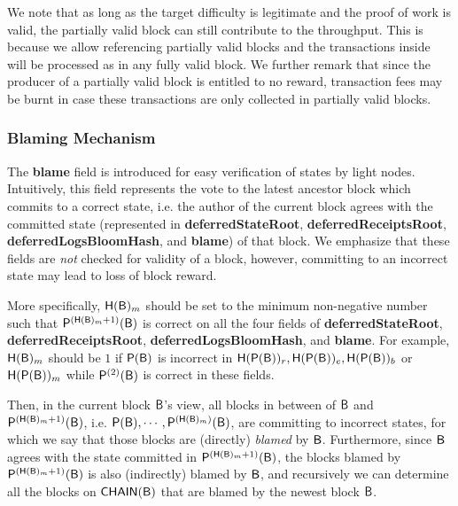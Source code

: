 We note that as long as the target difficulty is legitimate and the proof of work is valid,
the partially valid block can still contribute to the throughput.
This is because we allow referencing partially valid blocks and the transactions inside will be processed as in any fully valid block.
% 
We further remark that since the producer of a partially valid block is entitled to no reward, transaction fees may be burnt in case these transactions are only collected in partially valid blocks.







\subsubsection{Blaming Mechanism}
\label{sec:blaming}
	
	The {\bf blame} field is introduced for easy verification of states by light nodes.
	Intuitively, this field represents the vote to the latest ancestor block which commits to a correct state, 
	i.e. the author of the current block agrees with the committed state (represented in {\bf deferredStateRoot}, {\bf deferredReceiptsRoot}, {\bf deferredLogsBloomHash}, and {\bf blame}) of that block.
	We emphasize that these fields are \emph{not} checked for validity of a block, however, committing to an incorrect state may lead to loss of block reward.



	More specifically, $\textsf{H}(\textsf{B})_{m}$ should be set to the minimum non-negative number such that $\mathsf{P}^{\left(\textsf{H}(\textsf{B})_{m}+1\right)}(\textsf{B})$ is correct on all the four fields of {\bf deferredStateRoot}, {\bf deferredReceiptsRoot}, {\bf deferredLogsBloomHash}, and {\bf blame}.
	For example, $\textsf{H}(\textsf{B})_{m}$ should be $1$ if $\mathsf{P}{\left({\textsf{B}} \right)}$ is incorrect in $\textsf{H}(\mathsf{P}{\left({\textsf{B}} \right)})_{r}, \textsf{H}(\mathsf{P}{\left({\textsf{B}} \right)})_{e}, \textsf{H}(\mathsf{P}{\left({\textsf{B}} \right)})_{b}$ or $\textsf{H}(\mathsf{P}{\left({\textsf{B}} \right)})_{m}$ while $\mathsf{P}^{(2)}(\textsf{B})$ is correct in these fields.

	Then, in the current block $\textsf{B}$'s view, all blocks in between of $\textsf{B}$ and $\mathsf{P}^{\left(\textsf{H}(\textsf{B})_{m}+1\right)}(\textsf{B})$, i.e. $\mathsf{P}(\textsf{B}), \cdots, \mathsf{P}^{\left(\textsf{H}(\textsf{B})_{m}\right)}(\textsf{B})$, are committing to incorrect states, for which we say that those blocks are (directly) \emph{blamed} by $\textsf{B}$.
	Furthermore, since $\textsf{B}$ agrees with the state committed in $\mathsf{P}^{\left(\textsf{H}(\textsf{B})_{m}+1\right)}(\textsf{B})$,
	the blocks blamed by $\mathsf{P}^{\left(\textsf{H}(\textsf{B})_{m}+1\right)}(\textsf{B})$ is also (indirectly) blamed by $\textsf{B}$, and recursively we can determine all the blocks on $\mathsf{CHAIN}(\textsf{B})$ that are blamed by the newest block $\textsf{B}$.

